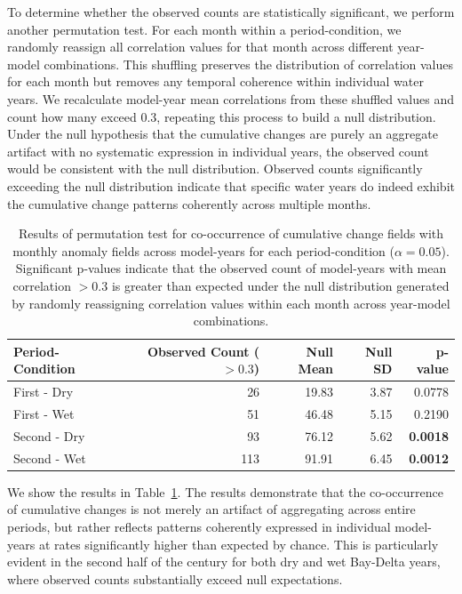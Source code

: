 To determine whether the observed counts are statistically significant, we perform another permutation test.
%
For each month within a period-condition, we randomly reassign all correlation values for that month across different year-model combinations.
%
This shuffling preserves the distribution of correlation values for each month but removes any temporal coherence within individual water years.
%
We recalculate model-year mean correlations from these shuffled values and count how many exceed 0.3, repeating this process to build a null distribution.
%
Under the null hypothesis that the cumulative changes are purely an aggregate artifact with no systematic expression in individual years, the observed count would be consistent with the null distribution.
%
Observed counts significantly exceeding the null distribution indicate that specific water years do indeed exhibit the cumulative change patterns coherently across multiple months.
\begin{table}
    \centering
\begin{tabular}{l r r r r}
\hline
Period-Condition & Observed Count ($>0.3$)  & Null Mean & Null SD & p-value \\
\hline
First - Dry & 26  & 19.83 & 3.87 & 0.0778 \\
First - Wet & 51  & 46.48 & 5.15 & 0.2190 \\
Second - Dry & 93  & 76.12 & 5.62 & \textbf{0.0018} \\
Second - Wet & 113 & 91.91 & 6.45 & \textbf{0.0012} \\
\hline
\end{tabular}
\caption{Results of permutation test for co-occurrence of cumulative change fields with monthly anomaly fields across model-years for each period-condition ($\alpha=0.05$). Significant p-values indicate that the observed count of model-years with mean correlation $>0.3$ is greater than expected under the null distribution generated by randomly reassigning correlation values within each month across year-model combinations.}
\label{tab:per_period_pvals}
\end{table}
%
We show the results in Table~\ref{tab:per_period_pvals}.
%
The results demonstrate that the co-occurrence of cumulative changes is not merely an artifact of aggregating across entire periods, but rather reflects patterns coherently expressed in individual model-years at rates significantly higher than expected by chance.
%
This is particularly evident in the second half of the century for both dry and wet Bay-Delta years, where observed counts substantially exceed null expectations.
%

